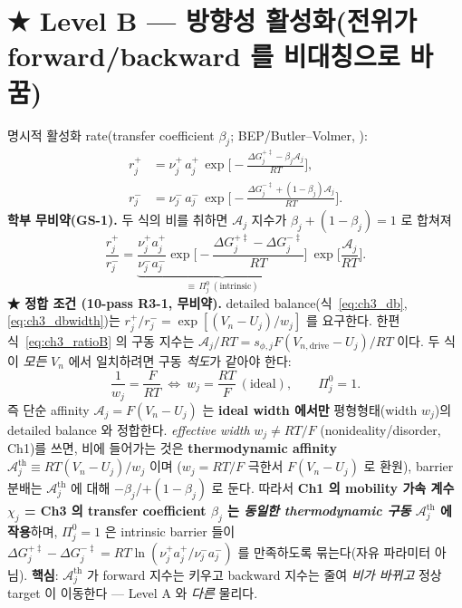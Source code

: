 \documentclass[11pt,a4paper]{article}
\newcommand{\drive}{\mathrm{drive}}\newcommand{\tot}{\mathrm{tot}}\newcommand{\bg}{\mathrm{bg}}
\begin{document}
\section{★ Level B — 방향성 활성화(전위가 forward/backward 를 비대칭으로 바꿈)}\label{sec:ch3_levelB}
명시적 활성화 rate(transfer coefficient $\beta_j$; BEP/Butler--Volmer, ):
\begin{align}
r_j^+&=\nu_j^+\,a_j^+\,\exp\!\Big[-\frac{\Delta G_j^{+\ddagger}-\beta_j\mathcal A_j}{RT}\Big],
\label{eq:ch3_rplus}\\
r_j^-&=\nu_j^-\,a_j^-\,\exp\!\Big[-\frac{\Delta G_j^{-\ddagger}+(1-\beta_j)\mathcal A_j}{RT}\Big].
\label{eq:ch3_rminus}
\end{align}
\textbf{학부 무비약(GS-1).} 두 식의 비를 취하면 $\mathcal A_j$ 지수가 $\beta_j+(1-\beta_j)=1$ 로 합쳐져
\begin{equation}
\frac{r_j^+}{r_j^-}=\underbrace{\frac{\nu_j^+a_j^+}{\nu_j^-a_j^-}\exp\!\Big[-\frac{\Delta G_j^{+\ddagger}-\Delta G_j^{-\ddagger}}{RT}\Big]}_{\textstyle \equiv\,\Pi_j^0\ (\text{intrinsic})}\ \exp\!\Big[\frac{\mathcal A_j}{RT}\Big].
\label{eq:ch3_ratioB}
\end{equation}
\textbf{★ 정합 조건 (10-pass R3-1, 무비약).} detailed balance(식~\eqref{eq:ch3_db},\eqref{eq:ch3_dbwidth})는
$r_j^+/r_j^-=\exp[(V_n-U_j)/w_j]$ 를 요구한다. 한편 식~\eqref{eq:ch3_ratioB} 의 구동 지수는
$\mathcal A_j/RT=s_{\phi,j}F(V_{n,\drive}-U_j)/RT$ 이다. 두 식이 \emph{모든} $V_n$ 에서 일치하려면
구동 \emph{척도}가 같아야 한다:
\begin{equation}
\frac{1}{w_j}=\frac{F}{RT}\ \Longleftrightarrow\ w_j=\frac{RT}{F}\ (\text{ideal}),\qquad \Pi_j^0=1.
\label{eq:ch3_dbconsist}
\end{equation}
즉 단순 affinity $\mathcal A_j=F(V_n-U_j)$ 는 \textbf{ideal width 에서만} 평형형태(width $w_j$)의 detailed
balance 와 정합한다. \emph{effective width} $w_j\ne RT/F$ (nonideality/disorder, Ch1)를 쓰면, 비에
들어가는 것은 \textbf{thermodynamic affinity} $\mathcal A_j^{\mathrm{th}}\equiv RT(V_n-U_j)/w_j$ 이며
($w_j=RT/F$ 극한서 $F(V_n-U_j)$ 로 환원), barrier 분배는 $\mathcal A_j^{\mathrm{th}}$ 에 대해
$-\beta_j$/$+(1-\beta_j)$ 로 둔다. 따라서 \textbf{Ch1 의 mobility 가속 계수 $\chi_j$ = Ch3 의
transfer coefficient $\beta_j$ 는 \emph{동일한 thermodynamic 구동} $\mathcal A_j^{\mathrm{th}}$ 에 작용}하며,
$\Pi_j^0=1$ 은 intrinsic barrier 들이 $\Delta G_j^{+\ddagger}-\Delta G_j^{-\ddagger}=RT\ln(\nu_j^+a_j^+/\nu_j^-a_j^-)$
를 만족하도록 묶는다(자유 파라미터 아님). \textbf{핵심}: $\mathcal A_j^{\mathrm{th}}$ 가 forward 지수는
키우고 backward 지수는 줄여 \emph{비가 바뀌고} 정상 target 이 이동한다 — Level A 와 \emph{다른} 물리다.
\end{document}
